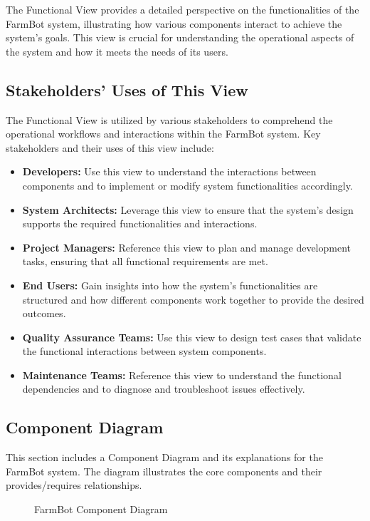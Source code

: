 The Functional View provides a detailed perspective on the functionalities of the FarmBot system, illustrating how various components interact to achieve the system's goals. This view is crucial for understanding the operational aspects of the system and how it meets the needs of its users.

\subsection{Stakeholders’ Uses of This View}

The Functional View is utilized by various stakeholders to comprehend the operational workflows and interactions within the FarmBot system. Key stakeholders and their uses of this view include:

\begin{itemize}
    \item \textbf{Developers:} Use this view to understand the interactions between components and to implement or modify system functionalities accordingly.
    \item \textbf{System Architects:} Leverage this view to ensure that the system’s design supports the required functionalities and interactions.
    \item \textbf{Project Managers:} Reference this view to plan and manage development tasks, ensuring that all functional requirements are met.
    \item \textbf{End Users:} Gain insights into how the system's functionalities are structured and how different components work together to provide the desired outcomes.
    \item \textbf{Quality Assurance Teams:} Use this view to design test cases that validate the functional interactions between system components.
    \item \textbf{Maintenance Teams:} Reference this view to understand the functional dependencies and to diagnose and troubleshoot issues effectively.
\end{itemize}

\subsection{Component Diagram}

This section includes a Component Diagram and its explanations for the FarmBot system. The diagram illustrates the core components and their provides/requires relationships.

\begin{figure}[H]
    \centering
    
    \caption{FarmBot Component Diagram}
\end{figure}

